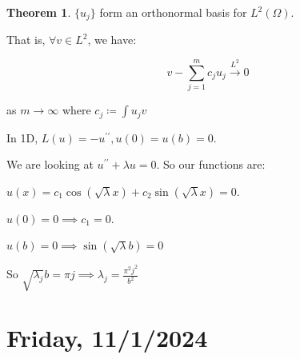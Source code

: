 \documentclass{article}
\theoremstyle{definition}
\newtheorem{theorem}{Theorem}
\begin{document}
\begin{theorem}
    \(\{ u_j \}\) form an orthonormal basis for \(L^2(\Omega)\).
\end{theorem}

That is, \(\forall v \in L^2\), we have:

\[
    v - \sum_{j=1}^m c_j u_j \overset{L^2}{\to} 0
\]

as \(m \to \infty\) where \(c_j \coloneqq \int u_j v\)  

In 1D, \(L(u) = -u^{\prime\prime}, u(0) = u(b) = 0\).

We are looking at \(u^{\prime\prime} + \lambda u = 0\). So our functions are:

\(u(x) = c_1 \cos (\sqrt{\lambda} x) + c_2 \sin (\sqrt{\lambda} x) = 0\).

\(u(0) = 0 \implies c_1 = 0\).

\(u(b) = 0 \implies \sin(\sqrt{\lambda} b) = 0\)

So \(\sqrt{\lambda_j} b = \pi j \implies \lambda_j = \frac{\pi^2 j^2}{b^2}\) 

\section*{Friday, 11/1/2024}
\end{document}
